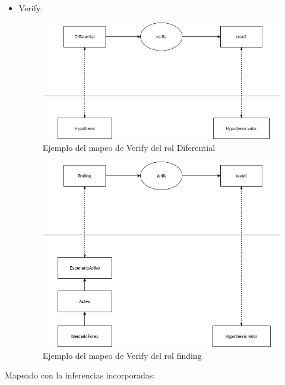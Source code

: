 \begin{itemize}
  \item Verify:  
  \begin{figure}[H]
    \centering
    \includegraphics[scale=0.50]{imagenes/verify1.png}
    \caption{\label{fig:Verify}Ejemplo del mapeo de Verify del rol Diferential}
  \end{figure}
  \begin{figure}[H]
    \centering
    \includegraphics[scale=0.50]{imagenes/verify2.png}
    \caption{\label{fig:verify2}Ejemplo del mapeo de Verify del rol finding}
  \end{figure}
\end{itemize}

Mapeado con la inferencias incorporadas:

